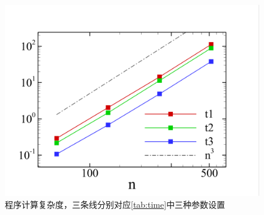 \documentclass[11pt]{article}
\begin{document}
\begin{figure}[htbp]
    \centering
    \includegraphics[width=0.6\linewidth]{figure/time.png}
    \caption{\label{fig:complex}程序计算复杂度，三条线分别对应\autoref{tab:time}中三种参数设置}
\end{figure}

\newpage


\end{document}
